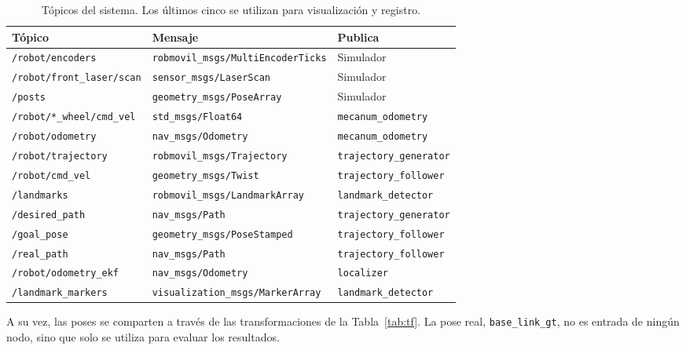 \documentclass[11pt,a4paper]{article}
\begin{document}
\begin{table}[htbp]
\centering
\small
\begin{tabular}{lll}
\toprule
\textbf{Tópico} & \textbf{Mensaje} & \textbf{Publica} \\
\midrule
\texttt{/robot/encoders} & \texttt{robmovil\_msgs/MultiEncoderTicks} & Simulador \\
\texttt{/robot/front\_laser/scan} & \texttt{sensor\_msgs/LaserScan} & Simulador \\
\texttt{/posts} & \texttt{geometry\_msgs/PoseArray} & Simulador \\
\texttt{/robot/*\_wheel/cmd\_vel} & \texttt{std\_msgs/Float64} & \texttt{mecanum\_odometry} \\
\texttt{/robot/odometry} & \texttt{nav\_msgs/Odometry} & \texttt{mecanum\_odometry} \\
\texttt{/robot/trajectory} & \texttt{robmovil\_msgs/Trajectory} & \texttt{trajectory\_generator} \\
\texttt{/robot/cmd\_vel} & \texttt{geometry\_msgs/Twist} & \texttt{trajectory\_follower} \\
\texttt{/landmarks} & \texttt{robmovil\_msgs/LandmarkArray} & \texttt{landmark\_detector} \\
\midrule
\texttt{/desired\_path} & \texttt{nav\_msgs/Path} & \texttt{trajectory\_generator} \\
\texttt{/goal\_pose} & \texttt{geometry\_msgs/PoseStamped} & \texttt{trajectory\_follower} \\
\texttt{/real\_path} & \texttt{nav\_msgs/Path} & \texttt{trajectory\_follower} \\
\texttt{/robot/odometry\_ekf} & \texttt{nav\_msgs/Odometry} & \texttt{localizer} \\
\texttt{/landmark\_markers} & \texttt{visualization\_msgs/MarkerArray} & \texttt{landmark\_detector} \\
\bottomrule
\end{tabular}
\caption{Tópicos del sistema. Los últimos cinco se utilizan para visualización y registro.}
\label{tab:topicos}
\end{table}

A su vez, las poses se comparten a través de las transformaciones de la Tabla~\ref{tab:tf}. La pose real, \texttt{base\_link\_gt}, no es entrada de ningún nodo, sino que solo se utiliza para evaluar los resultados.
\end{document}
